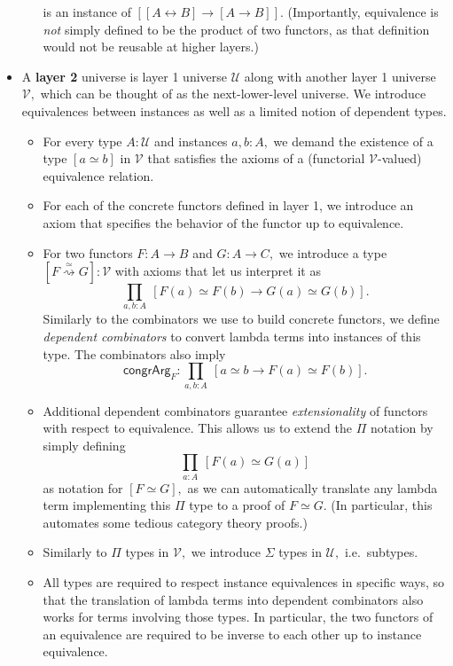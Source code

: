 \documentclass[a4paper]{article}
\theoremstyle{definition}
\theoremstyle{remark}
\newcommand{\defn}{\emph}
\renewcommand{\equiv}{\simeq}
\newcommand{\U}{\mathcal{U}}
\newcommand{\V}{\mathcal{V}}
\newcommand{\nm}{\mathsf}
\newcommand{\congrArg}{\nm{congrArg}}
\begin{document}
\begin{itemize}
\begin{itemize}
    is an instance of $[[A \leftrightarrow B] \to [A \to B]].$
    (Importantly, equivalence is \emph{not} simply defined to be the product of two functors, as
    that definition would not be reusable at higher layers.)
  \end{itemize}
  \item A \textbf{layer 2} universe is layer 1 universe $\U$ along with another layer 1 universe
  $\V,$ which can be thought of as the next-lower-level universe. We introduce equivalences between
  instances as well as a limited notion of dependent types.
  \begin{itemize}
    \item For every type $A : \U$ and instances $a,b : A,$ we demand the existence of a type
    $[a \equiv b]$ in $\V$ that satisfies the axioms of a (functorial $\V$-valued) equivalence
    relation.
    \item For each of the concrete functors defined in layer 1, we introduce an axiom that specifies
    the behavior of the functor up to equivalence.
    \item For two functors $F : A \to B$ and $G : A \to C,$ we introduce a type
    $[F \overset{\equiv}{\rightsquigarrow} G] : \V$ with axioms that let us interpret it as
    \[\prod_{a,b : A}\:[F(a) \equiv F(b) \to G(a) \equiv G(b)].\]
    Similarly to the combinators we use to build concrete functors, we define
    \defn{dependent combinators} to convert lambda terms into instances of this type. The
    combinators also imply
    \[\congrArg_F : \prod_{a,b : A}\:[a \equiv b \to F(a) \equiv F(b)].\]
    \item Additional dependent combinators guarantee \defn{extensionality} of functors with respect
    to equivalence. This allows us to extend the $\Pi$ notation by simply defining
    \[\prod_{a : A}\:[F(a) \equiv G(a)]\]
    as notation for $[F \equiv G],$ as we can automatically translate any lambda term implementing
    this $\Pi$ type to a proof of $F \equiv G.$ (In particular, this automates some tedious category
    theory proofs.)
    \item Similarly to $\Pi$ types in $\V,$ we introduce $\Sigma$ types in $\U,$ i.e.\ subtypes.
    \item All types are required to respect instance equivalences in specific ways, so that the
    translation of lambda terms into dependent combinators also works for terms involving those
    types. In particular, the two functors of an equivalence are required to be inverse to each
    other up to instance equivalence.

\end{itemize}
\end{itemize}
\end{document}
